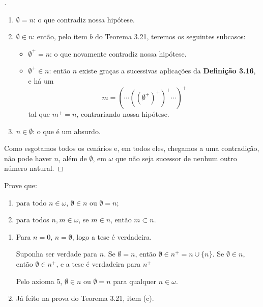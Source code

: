 \begin{enumerate}[label=(\alph{*})]
\begin{description}
\begin{proof}[]
			\begin{enumerate}[label=\textit{\arabic*º}, left=0pt, itemsep=0.5em]
				\item $\emptyset = n$: o que contradiz nossa hipótese.
				\item $\emptyset \in n$: então, pelo item $b$ do Teorema 3.21, teremos os seguintes subcasos:
				\begin{itemize}
					\item $\emptyset^+ = n$: o que novamente contradiz nossa hipótese.
					\item $\emptyset^+ \in n$: então $n$ existe graças a sucessivas aplicações da \textbf{Definição 3.16}, e há um 
					\[
					m = (\cdots((\emptyset^+)^+)^+\cdots)^+
					\]
					tal que $m^+ = n$, contrariando nossa hipótese.
				\end{itemize}
				\item $n \in \emptyset$: o que é um absurdo.
			\end{enumerate}

			Como esgotamos todos os cenários e, em todos eles, chegamos a uma contradição, não pode haver $n$, além de $\emptyset$, em $\omega$ que não seja sucessor de nenhum outro número natural.
		\end{proof}
	\end{description}
	
	
\end{enumerate}


\begin{exercicio}
	Prove que:
	\begin{enumerate}[label=(\alph{*})]
		\item para todo $n\in\omega$, $\emptyset\in n$ ou $\emptyset=n$;
		\item para todos $n,m\in\omega$, se $m\in n$, então $m\subset n$.
	\end{enumerate}
\end{exercicio}

\begin{enumerate}[label=(\alph{*})]
	\item Para $n=0$, $n=\emptyset$, logo a tese é verdadeira.
	
	Suponha ser verdade para $n$. Se $\emptyset=n$, então $\emptyset\in n^+=n\cup\{n\}$. Se $\emptyset\in n$, então $\emptyset\in n^+$, e a tese é verdadeira para $n^+$
	
	Pelo axioma 5, $\emptyset\in n$ ou $\emptyset=n$ para qualquer $n\in\omega$.
	\item Já feito na prova do Teorema 3.21, item (c).
\end{enumerate}


